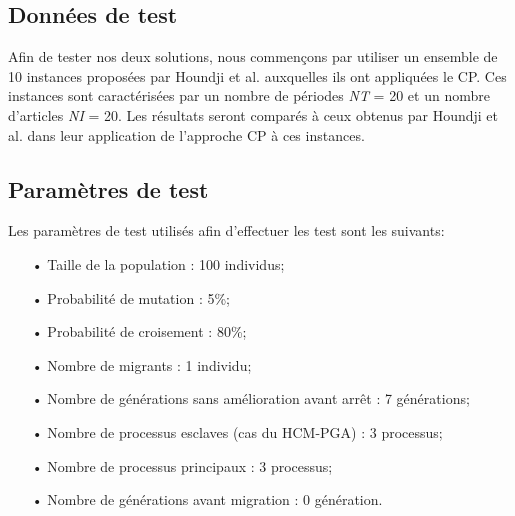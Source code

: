 \documentclass[12pt,a4paper]{article}
\begin{document}
		\subsection{Données de test}
		
		Afin de tester nos deux solutions, nous commençons par utiliser un ensemble de 10 instances proposées par Houndji et al. auxquelles ils ont appliquées le CP. Ces instances sont caractérisées par un nombre de périodes \emph{NT} = 20 et un nombre d'articles \emph{NI} = 20. Les résultats seront comparés à ceux obtenus par Houndji et al. dans leur application de l'approche CP à ces instances. %
		
		\subsection{Paramètres de test}
		Les paramètres de test utilisés afin d'effectuer les test sont les suivants:
		\begin{itemize}
			\item[•] Taille de la population : 100 individus;
			\item[•] Probabilité de mutation : 5\%;
			\item[•] Probabilité de croisement : 80\%;
			\item[•] Nombre de migrants : 1 individu;
			\item[•] Nombre de générations sans amélioration avant arrêt : 7 générations;
			\item[•] Nombre de processus esclaves (cas du HCM-PGA) : 3 processus;
			\item[•] Nombre de processus principaux : 3 processus;
			\item[•] Nombre de générations avant migration : 0 génération.
		\end{itemize}
		
\end{document}
